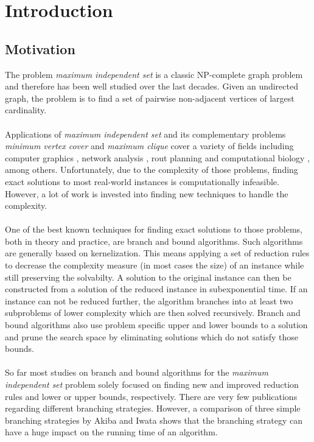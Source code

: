 \documentclass[]{article}
\title{}
\author{}
\begin{document}



\section{Introduction} \label{sec1}
\subsection{Motivation}
The problem \textit{maximum independent set} is a classic NP-complete graph problem\cite{gary_john} and therefore has been well studied over the last decades. Given an undirected graph, the problem is to find a set of pairwise non-adjacent vertices of largest cardinality.\\\\
Applications of \textit{maximum independent set} and its complementary problems \textit{minimum vertex cover} and \textit{maximum clique} cover a variety of fields including computer graphics \cite{cg}, network analysis \cite{nw}, rout planning \cite{rp} and computational biology \cite{bio1,bio2}, among others. Unfortunately, due to the complexity of those problems, finding exact solutions to most real-world instances is computationally infeasible. However, a lot of work is invested into finding new techniques to handle the complexity. \\\\
One of the best known techniques for finding exact solutions to those problems, both  in theory and practice, are branch and bound algorithms. Such algorithms are generally based on kernelization. This means applying a set of reduction rules to decrease the complexity measure (in most cases the size) of an instance while still preserving the solvabilty. A solution to the original instance can then be constructed from a solution of the reduced instance in subexponential time. If an instance can not be reduced further, the algorithm branches into at least two subproblems of lower complexity which are then solved recursively. Branch and bound algorithms also use problem specific upper and lower bounds to a solution and prune the search space by eliminating solutions which do not satisfy those bounds. \\\\
So far most studies on branch and bound algorithms for the \textit{maximum independent set} problem solely focused on finding new and improved reduction rules and lower or upper bounds, respectively. There are very few publications regarding different branching strategies. However, a comparison of three simple branching strategies by Akiba and Iwata \cite{akiba_iwata} shows that the branching strategy can have a huge impact on the running time of an algorithm.
\end{document}
